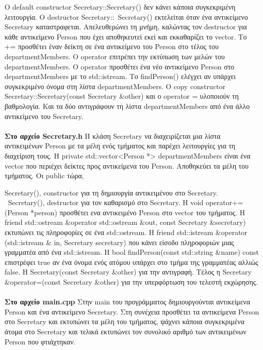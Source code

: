 \documentclass[12pt]{article}
\begin{document}
Ο default constructor Secretary::Secretary() δεν κάνει κάποια συγκεκριμένη λειτουργία.
Ο destructor Secretary::~Secretary() εκτελείται όταν ένα αντικείμενο Secretary καταστραφεται.
Απελευθερώνει τη μνήμη, καλώντας τον destructor για κάθε αντικείμενο Person που έχει αποθηκευτεί εκεί και εκκαθαρίζει το vector.
Το += προσθέτει έναν δείκτη σε ένα αντικείμενο του Person στο τέλος του departmentMembers.
Ο operator\guillemotleft{} επιτρέπει την εκτύπωση των μελών του departmentMembers.
Ο operator \guillemotright{} προσθέτει ένα νέο αντικείμενο Person στο departmentMembers με το std::istream.
Το  findPerson() ελέγχει αν υπάρχει συγκεκριμένο όνομα στη λίστα departmentMembers.
Ο copy constructor Secretary::Secretary(const Secretary \&other) και ο operator = υλοποιούν τη βαθμολογία.
Και τα δύο αντιγράφουν τη λίστα departmentMembers από ένα άλλο αντικείμενο του Secretary. \\
\\
\textbf{Στο αρχείο Secretary.h }
Η κλάση Secretary να διαχειρίζεται μια λίστα αντικειμένων Person με τα μέλη ενός τμήματος και παρέχει λειτουργίες για τη διαχείριση τους.
Η private std::vector<Person *> departmentMembers είναι ένα vector που περιέχει δείκτες προς αντικείμενα του Person. Αποθηκεύει τα μέλη του τμήματος.
Οι public τώρα,

Secretary(), constructor για τη δημιουργία αντικειμένου στο Secretary.
~Secretary(), destructor για τον καθαρισμό στο Secretary.
Η void operator+=(Person *person) προσθέτει ενα αντικειμένο Person στο vector του τμήματος.
Η friend std::ostream \&operator \guillemotleft{} std::ostream \&out, const Secretary \&secretary) εκτυπώνει τις πληροφορίες σε ένα std::ostream.
Η friend std::istream \&operator \guillemotright{} (std::istream \& in, Secretary secretary) που κάνει είσοδο πληροφοριών μιας γραμματέα από ένα std::istream.
Η bool findPerson(const std::string \&name) const επιστρέφει true αν ένα όνομα ενός ατόμου υπάρχει στο τμήμα της γραμματέας αλλιώς false.
Η Secretary(const Secretary \&other) για την αντιγραφή.
Τέλος η Secretary \&operator=(const Secretary \&other) για την υπερφόρτωση του τελεστή εκχώρησης.\\
\\
\textbf{Στο αρχείο main.cpp}
Στην main του προγράμματος δημιουργούνται αντικείμενα  Person και ένα αντικείμενο Secretary. Στη συνέχεια προσθέτει τα αντικείμενα Person στο Secretary και εκτυπώνει τα μέλη του τμήματος, ψάχνει κάποια 
συγκεκριμένα άτομα στο Secretary και τελικά εκτυπώνει τον συνολικό αριθμό των αντικειμένων Person που φτιάχτηκαν.
\end{document}
